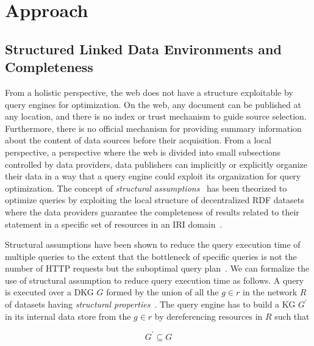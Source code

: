 \section{Approach}



\subsection{Structured Linked Data Environments and Completeness}
From a holistic perspective, the web does not have a structure exploitable by query engines for optimization.
On the web, any document can be published at any location, and there is no index or trust mechanism to guide source selection.
Furthermore, there is no official mechanism for providing summary information about the content of data sources before their acquisition.
From a local perspective, a perspective where the web is divided into small subsections controlled by data providers, data publishers can implicitly or explicitly organize their data  
in a way that a query engine could exploit its organization for query optimization.
The concept of \emph{structural assumptions}~\cite{Taelman2023} has been theorized to optimize queries by exploiting the local structure of decentralized RDF datasets where the data providers 
guarantee the completeness of results related to their statement in a specific set of resources in an IRI domain~\cite{Bogaerts2021LinkTW}.

Structural assumptions have been shown to reduce the query execution time of multiple queries to the extent that the bottleneck of specific queries is not the number of HTTP requests but the suboptimal query plan~\cite{Taelman2023, eschauzier_quweda_linkqueue_2023}.
We can formalize the use of structural assumption to reduce query execution time as follows.
A query is executed over a DKG $G$ formed by the union of all the $g \in r$ in the network $R$ of datasets having \emph{structural properties}~\cite{Taelman2023}.
The query engine has to build a KG $G^{\prime}$ in its internal data store from the  $g \in r$ by dereferencing resources in $R$ such that

\begin{equation}\label{eq:subsetDKG}
G^{\prime} \subseteq G
\end{equation}


